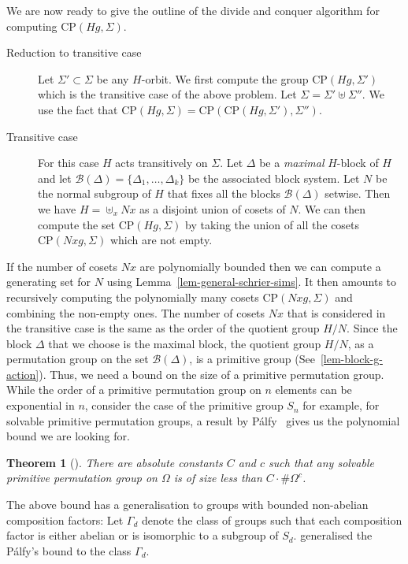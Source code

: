 \documentclass{article}
\newtheorem{theorem}{Theorem}[section]
\newcommand{\CP}[2]{\ensuremath{\mathrm{CP}\left(#1,#2\right)}}
\begin{document}
We are now ready to give the outline of the divide and conquer
algorithm for computing $\CP{Hg}{\Sigma}$.

\begin{description}
\item[Reduction to transitive case] Let $\Sigma'\subset \Sigma$ be any
  $H$-orbit. We first compute the group $\CP{Hg}{\Sigma'}$ which is
  the transitive case of the above problem.  Let $\Sigma = \Sigma'
  \uplus \Sigma''$. We use the fact that $\CP{Hg}{\Sigma} =
  \CP{\CP{Hg}{\Sigma'}}{\Sigma''}$.
\item[Transitive case] For this case $H$ acts transitively on
  $\Sigma$. Let $\Delta$ be a \emph{maximal} $H$-block of $H$ and let
  $\mathcal{B}(\Delta) = \{ \Delta_1, \ldots, \Delta_k\}$ be the
  associated block system. Let $N$ be the normal subgroup of $H$ that
  fixes all the blocks $\mathcal{B}(\Delta)$ setwise. Then we have $H
  = \uplus_x N x$ as a disjoint union of cosets of $N$. We can then
  compute the set $\CP{Hg}{\Sigma}$ by taking the union of all the
  cosets $\CP{Nxg}{\Sigma}$ which are not empty.
\end{description}

If the number of cosets $Nx$ are polynomially bounded then we can
compute a generating set for $N$ using
Lemma~\ref{lem-general-schrier-sims}. It then amounts to recursively
computing the polynomially many cosets $\CP{Nxg}{\Sigma}$ and
combining the non-empty ones. The number of cosets $Nx$ that is
considered in the transitive case is the same as the order of the
quotient group $H/N$. Since the block $\Delta$ that we choose is the
maximal block, the quotient group $H/N$, as a permutation group on the
set $\mathcal{B}(\Delta)$, is a primitive group
(See~\ref{lem-block-g-action}). Thus, we need a bound on the size of a
primitive permutation group. While the order of a primitive
permutation group on $n$ elements can be exponential in $n$, consider
the case of the primitive group $S_n$ for example, for solvable
primitive permutation groups, a result by P\'alfy~\cite[Theorem
1]{palfy82primitive} gives us the polynomial bound we are looking for.

\begin{theorem}[\citeauthor{palfy82primitive}]\label{thm-palfy}
  There are absolute constants $C$ and $c$ such that any solvable
  primitive permutation group on $\Omega$ is of size less than $C
  \cdot \# \Omega^c$.
\end{theorem}

The above bound has a generalisation to groups with bounded
non-abelian composition factors: Let $\Gamma_d$ denote the class of
groups such that each composition factor is either abelian or is
isomorphic to a subgroup of $S_d$. \citet{babai82primitive}
generalised the P\'alfy's bound to the class $\Gamma_d$.
\end{document}
